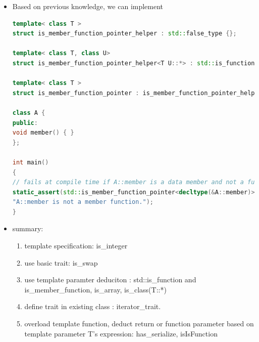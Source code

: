 \documentclass[a4paper,12pt,twoside]{book}
\begin{document}
\begin{itemize}
\begin{lstlisting}[frame=single, language=c++]
	\end{lstlisting}

\item Based on previous knowledge, we can implement 
\begin{lstlisting}[frame=single, language=c++]
template< class T >
struct is_member_function_pointer_helper : std::false_type {};

template< class T, class U>
struct is_member_function_pointer_helper<T U::*> : std::is_function<T> {};

template< class T >
struct is_member_function_pointer : is_member_function_pointer_helper< std::remove_cv_t<T> > {};

class A {
public:
void member() { }
};

int main()
{
// fails at compile time if A::member is a data member and not a function
static_assert(std::is_member_function_pointer<decltype(&A::member)>::value,
"A::member is not a member function."); 
}

\end{lstlisting}

\item summary:
\begin{enumerate}
	\item template specification: is\_integer
	\item use basic trait: is\_swap
	\item use template paramter deduciton : std::is\_function and
	 is\_member\_function, is\_array, is\_class(T::*)
	\item define trait in existing class : iterator\_trait.
	\item overload template function, deduct return or function parameter based on template parameter T's expression:  has\_serialize, isIsFunction
\end{enumerate}
	
\end{itemize}
\end{document}
